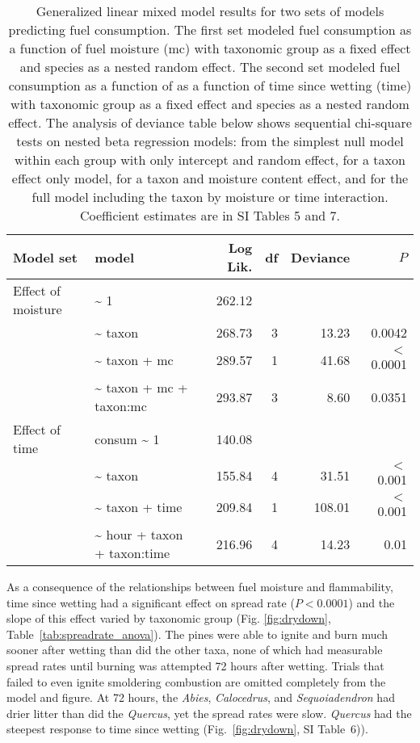 \documentclass[letterpaper,12pt]{article}
\begin{document}
\begin{table}
  \caption{Generalized linear mixed model results for two sets of models
    predicting fuel consumption. The first set modeled fuel consumption as a
    function of fuel moisture (mc) with taxonomic group as a fixed effect and
    species as a nested random effect. The second set modeled fuel consumption
    as a function of as a function of time since wetting (time) with taxonomic
    group as a fixed effect and species as a nested random effect. The analysis
    of deviance table below shows sequential chi-square tests on nested beta
    regression models: from the simplest null model within each group with only
    intercept and random effect, for a taxon effect only model, for a taxon and
    moisture content effect, and for the full model including the taxon by
    moisture or time interaction. Coefficient estimates are in SI Tables 5 and
    7.}
  \label{tab:consume_anova}
  \centering

  \begin{tabular}{llrrrr}
\toprule
Model set & model & Log Lik. & df & Deviance & $P$ \\ 
\midrule
  Effect of moisture &   \~{} 1 & 262.12 &  &  &  \\ 
   &  \~{} taxon & 268.73 & 3 & 13.23 & 0.0042 \\ 
   & \~{} taxon + mc & 289.57 & 1 & 41.68 & $<$ 0.0001 \\ 
   & \~{} taxon + mc + taxon:mc & 293.87 & 3 & 8.60 & 0.0351 \\ 
\midrule
Effect of time &  consum \~{} 1 & 140.08 &  &  &  \\ 
 & \~{} taxon & 155.84 & 4 & 31.51 & $<$ 0.001 \\ 
 & \~{} taxon + time & 209.84 & 1 & 108.01 & $<$ 0.001 \\ 
 & \~{} hour + taxon + taxon:time & 216.96 & 4 & 14.23 & 0.01 \\ 
    \bottomrule
    \end{tabular}
\end{table}


As a consequence of the relationships between fuel moisture and flammability,
time since wetting had a significant effect on spread rate ($P < 0.0001$) and
the slope of this effect varied by taxonomic group (Fig. \ref{fig:drydown},
Table~\ref{tab:spreadrate_anova}). The pines were able to ignite and burn much
sooner after wetting than did the other taxa, none of which had measurable
spread rates until burning was attempted 72 hours after wetting. Trials that
failed to even ignite smoldering combustion are omitted completely from the
model and figure. At 72 hours, the \emph{Abies}, \emph{Calocedrus}, and
\emph{Sequoiadendron} had drier litter than did the \emph{Quercus}, yet the
spread rates were slow. \emph{Quercus} had the steepest response to time since
wetting (Fig.~\ref{fig:drydown}, SI Table~6)).
\end{document}
